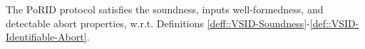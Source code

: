 \begin{theorem}
The PoRID protocol satisfies the soundness, inputs well-formedness, and detectable abort properties, w.r.t. Definitions \ref{deff::VSID-Soundness}-\ref{def::VSID-Identifiable-Abort}.
\end{theorem}















